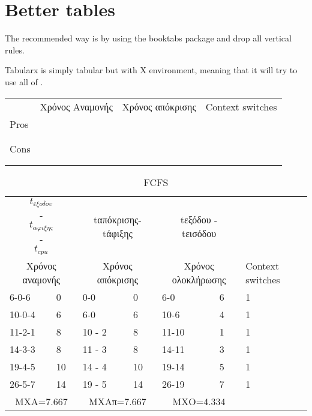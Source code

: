 \section{Better tables}
The recommended way is by using the booktabs package and drop all vertical rules.

Tabularx is simply tabular but with X environment, meaning that it will try to use all of \texttt{\linewidth}.

\begin{center}
  \begin{tabularx}{\textwidth}{l*{2}{X}}
    \toprule
         & Χρόνος Αναμονής & Χρόνος απόκρισης & Context switches \\
    \cmidrule(lr){3-4}
    Pros &     &    \\
         &     &    \\
         &     &    \\
    \midrule
    Cons &     &    \\
         &     &    \\
         &     &    \\
    \bottomrule
  \end{tabularx}
\end{center}
\begin{table}[!ht]
    \centering
    \caption{FCFS}
    \begin{tabular}{|l|l|l|l|l|l|l|}
        \hline
        \multicolumn{2}{|c|}{\[t_{εξοδου}\]-\[t_{αφιξης}\]-\[t_{cpu}\]} & \multicolumn{2}{c|}{tαπόκρισης-tάφιξης} & \multicolumn{2}{c|}{tεξόδου - tεισόδου} & ~\\ 
        
        \multicolumn{2}{|c|}{Χρόνος αναμονής} & \multicolumn{2}{c|}{Χρόνος απόκρισης} & \multicolumn{2}{c|}{Χρόνος ολοκλήρωσης} & Context switches \\ 

        \hline
        6-0-6 & 0 & 0-0  & 0 & 6-0 & 6 & 1 \\ \hline
        10-0-4 & 6 & 6-0  & 6 & 10-6 & 4 & 1 \\ \hline
        11-2-1  & 8 & 10 - 2  & 8 & 11-10 & 1 & 1 \\ \hline
        14-3-3  & 8 & 11 - 3  & 8 & 14-11 & 3 & 1 \\ \hline
        19-4-5  & 10 & 14 - 4  & 10 & 19-14 & 5 & 1 \\ \hline
        26-5-7  & 14 & 19 - 5  & 14 & 26-19 & 7 & 1 \\ \hline
        \multicolumn{2}{|c|}{ΜΧΑ=7.667} & \multicolumn{2}{c|}{ΜΧΑπ=7.667} & \multicolumn{2}{c|}{ΜΧΟ=4.334} & ~ \\ 
        \hline
    \end{tabular}
\end{table}




